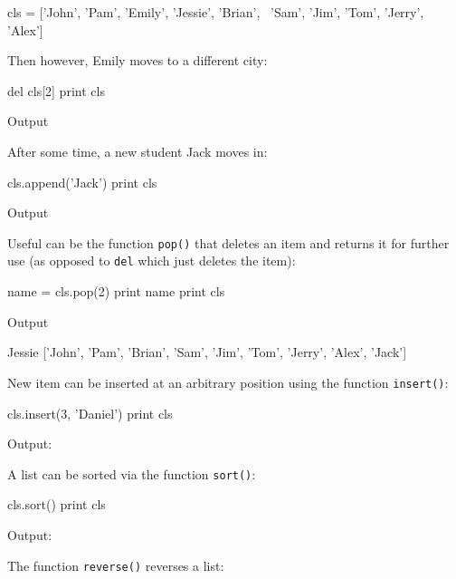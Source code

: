 \begin{bluecode}
cls = ['John', 'Pam', 'Emily', 'Jessie', 'Brian', \
'Sam', 'Jim', 'Tom', 'Jerry', 'Alex']
\end{bluecode}
Then however, Emily moves to a different city:

\begin{bluecode}
del cls[2]
print cls
\end{bluecode}
Output

\begin{bluecode}
\end{bluecode}
After some time, a new student Jack moves in:

\begin{bluecode}
cls.append('Jack')
print cls
\end{bluecode}
Output

\begin{bluecode}
\end{bluecode}
Useful can be the function {\tt pop()} that deletes an item and returns it for further
use (as opposed to {\tt del} which just deletes the item):

\begin{bluecode}
name = cls.pop(2)
print name 
print cls
\end{bluecode}
Output

\begin{bluecode}
Jessie
['John', 'Pam', 'Brian', 'Sam', 'Jim', 
'Tom', 'Jerry', 'Alex', 'Jack']
\end{bluecode}
New item can be inserted at an arbitrary position using the function {\tt insert()}:

\begin{bluecode}
cls.insert(3, 'Daniel')
print cls
\end{bluecode}
Output:

\begin{bluecode}
\end{bluecode}
A list can be sorted via the function {\tt sort()}:

\begin{bluecode}
cls.sort()
print cls
\end{bluecode}
Output:

\begin{bluecode}
\end{bluecode}
The function {\tt reverse()} reverses a list:

